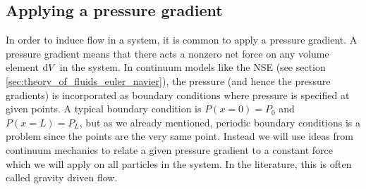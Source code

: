 \subsection{Applying a pressure gradient}
\label{sec:dsmc_applying_pressured_grad}
In order to induce flow in a system, it is common to apply a pressure gradient. A pressure gradient means that there acts a nonzero net force on any volume element $\mathrm{d}V$ in the system. In continuum models like the NSE (see section \ref{sec:theory_of_fluids_euler_navier}), the pressure (and hence the pressure gradients) is incorporated as boundary conditions where pressure is specified at given points. A typical boundary condition is $P(x=0) = P_0$ and $P(x=L) = P_L$, but as we already mentioned, periodic boundary conditions is a problem since the points are the very same point. Instead we will use ideas from continuum mechanics to relate a given pressure gradient to a constant force which we will apply on all particles in the system. In the literature, this is often called gravity driven flow.

